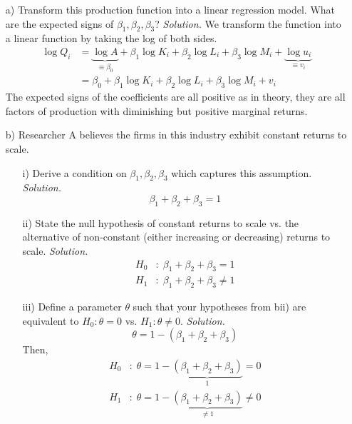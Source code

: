 \documentclass[
]{article}
\begin{document}
\begin{enumerate}
\item[a)] Transform this production function into a linear regression model. What are the expected signs of $\beta_1, \beta_2, \beta_3$?
\newline
\newline
\textit{Solution.} We transform the function into a linear function by taking the log of both sides. 
\[\begin{aligned}
\log Q_i &= \underbrace{\log A}_{\equiv \beta_0} + \beta_1 \log K_i + \beta_2 \log L_i + \beta_3 \log M_i + \underbrace{\log u_i}_{\equiv v_i} \\
&= \beta_0 + \beta_1 \log K_i + \beta_2 \log L_i + \beta_3 \log M_i + v_i
\end{aligned}\]
The expected signs of the coefficients are all positive as in theory, they are all factors of production with diminishing but positive marginal returns. 

\item[b)] Researcher A believes the firms in this industry exhibit constant returns to scale.
\begin{enumerate}
\item[i)] Derive a condition on $\beta_1, \beta_2, \beta_3$ which captures this assumption.
\newline
\newline
\textit{Solution.}
\[\beta_1 + \beta_2 + \beta_3 = 1\]
\item[ii)] State the null hypothesis of constant returns to scale vs. the alternative of non-constant (either increasing or decreasing) returns to scale.
\newline
\newline
\textit{Solution.}
\[\begin{aligned}
H_0&:\; \beta_1 + \beta_2 + \beta_3 = 1 \\
H_1&:\; \beta_1 + \beta_2 + \beta_3 \ne 1
\end{aligned}\]
\item[iii)] Define a parameter $\theta$ such that your hypotheses from bii) are equivalent to $H_0 : \theta = 0$ vs. $H_1:\theta \ne 0$.
\newline
\newline
\textit{Solution.}
\[\theta = 1 - (\beta_1 + \beta_2 + \beta_3)\]
Then, 
\[\begin{aligned}
H_0&:\; \theta = 1 - \underbrace{(\beta_1 + \beta_2 + \beta_3)}_{1} = 0 \\
H_1&:\; \theta = 1 - \underbrace{(\beta_1 + \beta_2 + \beta_3)}_{\ne 1} \ne 0
\end{aligned}\]


\end{enumerate}
\end{enumerate}
\end{document}
